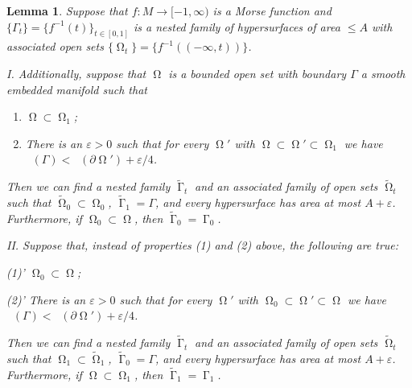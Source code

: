\documentclass[12pt]{amsart}
\newtheorem{lemma}[theorem]{Lemma}
\DeclareMathOperator{\Hn}{\mathcal{H}^n}
\DeclareMathOperator{\G}{\Gamma}
\DeclareMathOperator{\Om}{\Omega}
\theoremstyle{definition}
\begin{document}
    
    
    \begin{lemma}
	\label{lem:split}
	Suppose that $f: M \rightarrow [-1,\infty)$ is a Morse
	function and $\{ \Gamma_t \} = \{ f^{-1}(t) \}_{t \in [0,1]}$ is a 
	nested family of hypersurfaces of area $\leq A$ 
	with associated open sets $\{ \Om_t \} = 
	 \{ f^{-1}((-\infty, t)) \}$.
	
	I. Additionally, suppose that $\Om$ is a bounded open set 
	with boundary $\Gamma$ a smooth embedded manifold such that
	\begin{enumerate}
		\item %
		      $\Om \subset \Om_1$;
        \item There is an $\varepsilon > 0$ such that
                for every $\Om'$ with $\Om \subset \Om' \subset \Om_1$ we have
                $\Hn( \Gamma)  <  \Hn(\partial \Om') + \varepsilon/4$.
	\end{enumerate}

	Then we can find a nested family $\tilde{\G}_t$ and an associated
	family of open sets $\tilde{\Om}_t$ such that $\tilde{\Om}_0 \subset \Om_0$, $\tilde{\G}_1 = \Gamma$,
	and every hypersurface has area at most $A + \varepsilon$.
	Furthermore, if $\Om_0 \subset \Om$, then $\tilde{\G}_0 = \G_0$.
	
	II. Suppose that, instead of properties (1) and (2) above, the following are true:
	
		(1)' %
		      $\Om_0 \subset \Om$;
		      
		(2)'    There is an $\varepsilon > 0$ such that
                for every $\Om'$ with $\Om_0 \subset \Om' \subset \Om$ we have
                $\Hn( \Gamma)  <  \Hn(\partial \Om') + \varepsilon/4$.
		

	Then we can find a nested family $\tilde{\G}_t$ and an associated
	family of open sets $\tilde{\Om}_t$ such that $\Om_1 \subset \tilde{\Om}_1$, $\tilde{\G}_0 = \Gamma$,
	and every hypersurface has area at most $A + \varepsilon$.
	Furthermore, if $\Om \subset \Om_1$, then $\tilde{\G}_1 = \G_1$.

\end{lemma}
\end{document}
